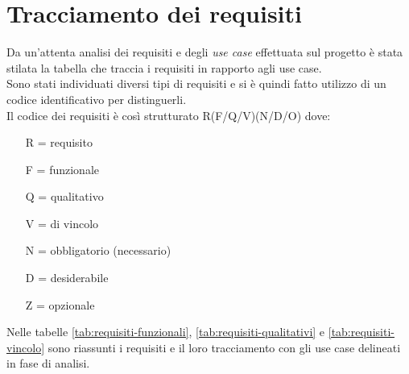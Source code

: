 \section{Tracciamento dei requisiti}
Da un'attenta analisi dei requisiti e degli \textit{use case} effettuata sul
progetto è
stata stilata la tabella che traccia i requisiti in rapporto agli use case.\\
Sono stati individuati diversi tipi di requisiti e si è quindi fatto utilizzo
di un codice identificativo per distinguerli.\\
Il codice dei requisiti è così strutturato R(F/Q/V)(N/D/O) dove:
\begin{enumerate}[nolistsep]
    \item[R =] requisito
    \item[F =] funzionale
    \item[Q =] qualitativo
    \item[V =] di vincolo
    \item[N =] obbligatorio (necessario)
    \item[D =] desiderabile
    \item[Z =] opzionale
\end{enumerate}
Nelle tabelle \ref{tab:requisiti-funzionali}, \ref{tab:requisiti-qualitativi} e
\ref{tab:requisiti-vincolo} sono riassunti i requisiti e il loro tracciamento
con gli use case delineati in fase di analisi.



